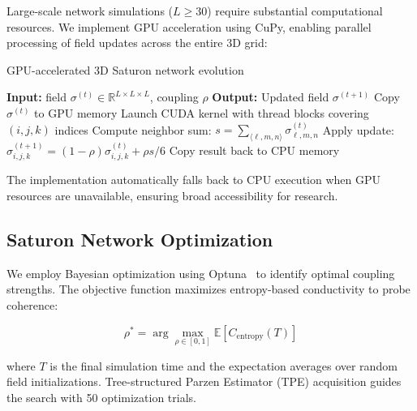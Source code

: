 Large-scale \saturon{} network simulations ($L \geq 30$) require substantial 
computational resources. We implement GPU acceleration using CuPy, enabling 
parallel processing of \saturon{} field updates across the entire 3D grid:

\begin{algorithm}[t]
\caption{GPU-accelerated 3D Saturon network evolution}
\label{alg:gpu_saturon}
\begin{algorithmic}[1]
\STATE \textbf{Input:} \saturon{} field $\sigma^{(t)} \in \mathbb{R}^{L \times L \times L}$, coupling $\rho$
\STATE \textbf{Output:} Updated \saturon{} field $\sigma^{(t+1)}$
\STATE Copy $\sigma^{(t)}$ to GPU memory
\STATE Launch CUDA kernel with thread blocks covering $(i,j,k)$ indices
    \STATE Compute \saturon{} neighbor sum: $s = \sum_{\langle \ell,m,n \rangle} \sigma_{\ell,m,n}^{(t)}$
    \STATE Apply \posp{} update: $\sigma_{i,j,k}^{(t+1)} = (1-\rho)\sigma_{i,j,k}^{(t)} + \rho s/6$
\ENDFOR
\STATE Copy result back to CPU memory
\end{algorithmic}
\end{algorithm}

The implementation automatically falls back to CPU execution when GPU resources 
are unavailable, ensuring broad accessibility for \posp{} research.

\subsection{Saturon Network Optimization}

We employ Bayesian optimization using Optuna~\cite{optuna2019} to identify 
optimal \saturon{} coupling strengths. The objective function maximizes 
entropy-based conductivity to probe \saturon{} coherence:

\begin{equation}
\rho^* = \arg\max_{\rho \in [0,1]} \mathbb{E}[C_{\text{entropy}}(T)]
\label{eq:saturon_optimization}
\end{equation}

where $T$ is the final simulation time and the expectation averages over 
random \saturon{} field initializations. Tree-structured Parzen Estimator 
(TPE) acquisition guides the search with 50 optimization trials.

